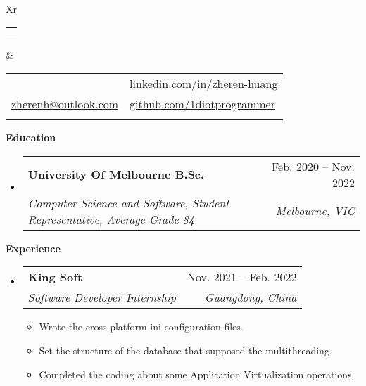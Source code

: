 \documentclass[letterpaper,12pt]{article}[leftmargin=*]
\makeatletter
\def \fullname {Zheren Huang}
\def \subtitle {}
\def \linkedinicon {\faLinkedin}
\def \linkedinlink {https://linkedin.com/in/zheren-huang-9133a6235/}
\def \linkedintext {linkedin.com/in/zheren-huang}
\def \phoneicon {\faPhone}
\def \phonetext {+61 466641756}
\def \emailicon {\faEnvelope}
\def \emaillink {mailto:zherenh@outlook.com}
\def \emailtext {zherenh@outlook.com}
\def \githubicon {\faGithub}
\def \githublink {https://github.com/1diotprogrammer}
\def \githubtext {github.com/1diotprogrammer}
\def \headertype {\doublecol}
\def \entryspacing {-0pt}
\def \linkedin {\linkedinicon \hspace{3pt}\href{\linkedinlink}{\linkedintext}}
\def \phone {\phoneicon \hspace{3pt}{ \phonetext}}
\def \email {\emailicon \hspace{3pt}\href{\emaillink}{\emailtext}}
\def \github {\githubicon \hspace{3pt}\href{\githublink}{\githubtext}}
\def \website {\websiteicon \hspace{3pt}\href{\websitelink}{\websitetext}}
\renewcommand{\section}[2]{\vspace{5pt}
  \colorbox{secondary}{\color{white}\raggedbottom\normalsize\textbf{{#1}{\hspace{7pt}#2}}}
}
\newcommand{\resumeEntryStart}{\begin{itemize}[leftmargin=2.5mm]}
\newcommand{\resumeEntryEnd}{\end{itemize}\vspace{\entryspacing}}
\newcommand{\resumeItemListStart}{\begin{itemize}[leftmargin=4.5mm]}
\newcommand{\resumeItemListEnd}{\end{itemize}}
\newcommand{\resumeItem}[1]{
  \item\small{
    {#1 \vspace{-2pt}}
  }
}
\newcommand{\resumeEntryTSDL}[4]{
  \vspace{-1pt}\item[]
    \begin{tabularx}{0.97\textwidth}{X@{\hspace{60pt}}r}
      \textbf{\color{primary}#1} & {\firabook\color{accent}\small#2} \\
      \textit{\color{accent}\small#3} & \textit{\color{accent}\small#4} \\
    \end{tabularx}\vspace{-6pt}
}
\newcommand{\doublecol}[6]{
  \begin{tabularx}{\textwidth}{Xr}
    {
      \begin{tabular}[c]{l}
        \fontsize{35}{45}\selectfont{\color{primary}{{\textbf{\fullname}}}} \\
        {\textit{\subtitle}} 
      \end{tabular}
    } & {
      \begin{tabular}[c]{l@{\hspace{1.5em}}l}
        {\small#4} & {\small#1} \\
        {\small#5} & {\small#2} \\
        {\small#6} & {\small#3}
      \end{tabular}
    }
  \end{tabularx}
}
\makeatother
\begin{document}
\headertype{\linkedin}{\github}{\website}{\phone}{\email}{} 
\vspace{-10pt}  


\section{\faGraduationCap}{Education}

  \resumeEntryStart
    \resumeEntryTSDL
      {University Of Melbourne B.Sc.}{Feb. 2020 -- Nov. 2022}
      {Computer Science and Software, Student Representative, Average Grade 84}{Melbourne, VIC}
  \resumeEntryEnd
  


\section{\faPieChart}{Experience}

  \resumeEntryStart
    \resumeEntryTSDL
      {King Soft}{Nov. 2021 -- Feb. 2022}
      {Software Developer Internship}{Guangdong, China}
    \resumeItemListStart
      \resumeItem {Wrote the cross-platform ini configuration files.}
      \resumeItem {Set the structure of the database that supposed the multithreading.}
      \resumeItem {Completed the coding about some Application Virtualization operations.}
    \resumeItemListEnd
  \resumeEntryEnd
  
\end{document}
